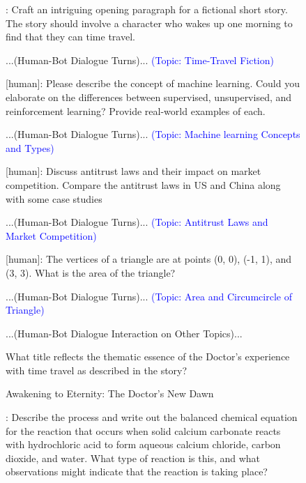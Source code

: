 \begin{figure}[htb]
\small
\begin{tcolorbox}[left=3pt,right=3pt,top=3pt,bottom=3pt,title=\textbf{Conversation History:}]
[human]: Craft an intriguing opening paragraph for a fictional short story. The story should involve a character who wakes up one morning to find that they can time travel.

...(Human-Bot Dialogue Turns)... \textcolor{blue}{(Topic: Time-Travel Fiction)}

[human]: Please describe the concept of machine learning. Could you elaborate on the differences between supervised, unsupervised, and reinforcement learning? Provide real-world examples of each.

...(Human-Bot Dialogue Turns)... \textcolor{blue}{(Topic: Machine learning Concepts and Types)}


[human]: Discuss antitrust laws and their impact on market competition. Compare the antitrust laws in US and China along with some case studies

...(Human-Bot Dialogue Turns)... \textcolor{blue}{(Topic: Antitrust Laws and Market Competition)}

[human]: The vertices of a triangle are at points (0, 0), (-1, 1), and (3, 3). What is the area of the triangle?

...(Human-Bot Dialogue Turns)... \textcolor{blue}{(Topic: Area and Circumcircle of Triangle)}

...(Human-Bot Dialogue Interaction on Other Topics)... 

\end{tcolorbox}
\begin{tcolorbox}[left=3pt,right=3pt,top=3pt,bottom=3pt,title=\textbf{Question:}]
What title reflects the thematic essence of the Doctor's experience with time travel as described in the story?
\end{tcolorbox}
\begin{tcolorbox}[left=3pt,right=3pt,top=3pt,bottom=3pt,title=\textbf{Ground-Truth Answer:}]
Awakening to Eternity: The Doctor's New Dawn
\end{tcolorbox}
\begin{tcolorbox}[left=3pt,right=3pt,top=3pt,bottom=3pt,title=\textbf{Retrieved Memory (Turn-Level):}]
[human]: Describe the process and write out the balanced chemical equation for the reaction that occurs when solid calcium carbonate reacts with hydrochloric acid to form aqueous calcium chloride, carbon dioxide, and water. What type of reaction is this, and what observations might indicate that the reaction is taking place?


\end{tcolorbox}
\end{figure}

